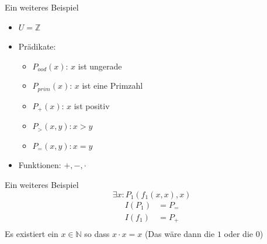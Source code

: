 \begin{frame}{Ein weiteres Beispiel}
    \begin{itemize}
        \item $U = \mathbb Z$
        \item Prädikate:
        \begin{itemize}
            \item $P_{ood}(x)$: $x$ ist ungerade
            \item $P_{prim}(x)$: $x$ ist eine Primzahl
            \item $P_{+}(x)$: $x$ ist positiv
            \item $P_>(x,y): x>y$ 
            \item $P_=(x,y): x=y$ 
        \end{itemize}
        \item Funktionen: $+, -, \cdot$ 
    \end{itemize}
\end{frame}

\begin{frame}{Ein weiteres Beispiel}
    $$\exists x: P_1(f_1(x,x),x)$$
    \pause
        \begin{align*}
            I(P_1) &= P_{=}\\
            I(f_1) &= P_{+}\\
        \end{align*}
        \pause
        Es existiert ein $x \in \mathbb N$ so dass $x\cdot x = x$
        (Das wäre dann die $1$ oder die $0$) 
\end{frame}

